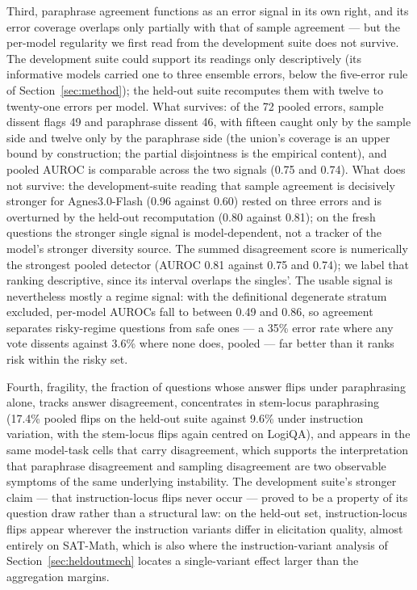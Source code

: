 Third, paraphrase agreement functions as an error signal in its own right, and its error coverage overlaps only partially with that of sample agreement --- but the per-model regularity we first read from the development suite does not survive. The development suite could support its readings only descriptively (its informative models carried one to three ensemble errors, below the five-error rule of Section~\ref{sec:method}); the held-out suite recomputes them with twelve to twenty-one errors per model. What survives: of the 72 pooled errors, sample dissent flags 49 and paraphrase dissent 46, with fifteen caught only by the sample side and twelve only by the paraphrase side (the union's coverage is an upper bound by construction; the partial disjointness is the empirical content), and pooled AUROC is comparable across the two signals (0.75 and 0.74). What does not survive: the development-suite reading that sample agreement is decisively stronger for Agnes3.0-Flash (0.96 against 0.60) rested on three errors and is overturned by the held-out recomputation (0.80 against 0.81); on the fresh questions the stronger single signal is model-dependent, not a tracker of the model's stronger diversity source. The summed disagreement score is numerically the strongest pooled detector (AUROC 0.81 against 0.75 and 0.74); we label that ranking descriptive, since its interval overlaps the singles'. The usable signal is nevertheless mostly a regime signal: with the definitional degenerate stratum excluded, per-model AUROCs fall to between 0.49 and 0.86, so agreement separates risky-regime questions from safe ones --- a 35\% error rate where any vote dissents against 3.6\% where none does, pooled --- far better than it ranks risk within the risky set.

Fourth, fragility, the fraction of questions whose answer flips under paraphrasing alone, tracks answer disagreement, concentrates in stem-locus paraphrasing (17.4\% pooled flips on the held-out suite against 9.6\% under instruction variation, with the stem-locus flips again centred on LogiQA), and appears in the same model-task cells that carry disagreement, which supports the interpretation that paraphrase disagreement and sampling disagreement are two observable symptoms of the same underlying instability. The development suite's stronger claim --- that instruction-locus flips never occur --- proved to be a property of its question draw rather than a structural law: on the held-out set, instruction-locus flips appear wherever the instruction variants differ in elicitation quality, almost entirely on SAT-Math, which is also where the instruction-variant analysis of Section~\ref{sec:heldoutmech} locates a single-variant effect larger than the aggregation margins.

